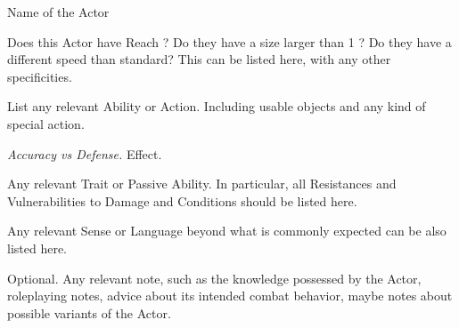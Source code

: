 \begin{monsterboxbg}{Name of the Actor}

    \basics[
    armorclass = 3,
    hitpoints  = 42, %
    focus      = 5,
    defenses   = {Deflection 0, Reflex 0, Fortitude 0, Will 0}
    ]
    \rpghline%

    \details[%
    skills = {Athletics 3, Kosmics 1},
    accuracies = {Melee 6, Ranged 6},
    challenge=Elite,
    ]
    \rpghline%
    \begin{rpg-monsteraction}
        Does this Actor have Reach ? Do they have a size larger than 1 ? Do they have a different speed than standard? This can be listed here, with any other specificities.
    \end{rpg-monsteraction}


    \begin{rpg-monsteraction}
        List any relevant Ability or Action. Including usable objects and any kind of special action.
    \end{rpg-monsteraction}

    \begin{rpg-monsteraction}
        \textit{Accuracy vs Defense.} Effect.
    \end{rpg-monsteraction}



    \begin{rpg-monsteraction}[Trait]
    Any relevant Trait or Passive Ability. In particular, all Resistances and Vulnerabilities to Damage and Conditions should be listed here.
    \end{rpg-monsteraction}

    \begin{rpg-monsteraction}[Senses]
    Any relevant Sense or Language beyond what is commonly expected can be also listed here.
    \end{rpg-monsteraction}

    
    Optional. Any relevant note, such as the knowledge possessed by the Actor, roleplaying notes, advice about its intended combat behavior, maybe notes about possible variants of the Actor.

\end{monsterboxbg}



